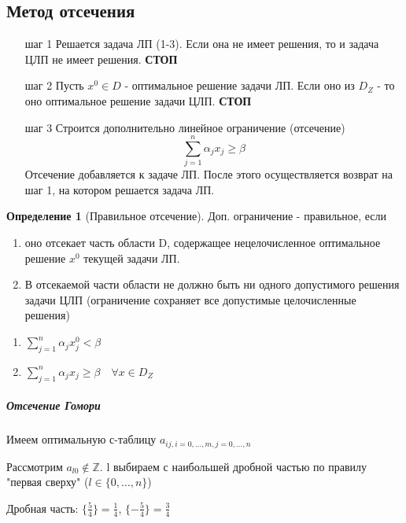 \documentclass[a4paper]{article}
\theoremstyle{definition}
\newtheorem*{definition}{Определение}
\theoremstyle{remark}
\begin{document}
\subsection{Метод отсечения}
\begin{enumerate}
    \item [шаг 1] Решается задача ЛП (1-3). Если она не имеет решения, то и задача ЦЛП не имеет решения. \textbf{СТОП}
    \item [шаг 2] Пусть $x^0\in D$ - оптимальное решение задачи ЛП. Если оно из $D_Z$ - то оно оптимальное решение задачи ЦЛП. \textbf{СТОП}
    \item [шаг 3] Строится дополнительно линейное ограничение (отсечение)
    \[\sum_{j = 1}^n \alpha_j x_j \ge \beta\]
    Отсечение добавляется к задаче ЛП.
    После этого осуществляется возврат на шаг 1, на котором решается задача ЛП.
\end{enumerate}
\begin{definition}[Правильное отсечение]
    Доп. ограничение - правильное, если
    \begin{enumerate}
        \item оно отсекает часть области D, содержащее нецелочисленное оптимальное решение $x^0$ текущей задачи ЛП.
        \item В отсекаемой части области не должно быть ни одного допустимого решения задачи ЦЛП (ограничение сохраняет все допустимые целочисленные решения)
    \end{enumerate}
\end{definition}
\begin{enumerate}
    \item $\sum_{j = 1}^n \alpha_j x_j^0 < \beta$
    \item  $\sum_{j = 1}^n \alpha_j x_j \ge \beta \quad \forall x \in D_Z$
\end{enumerate}
\subparagraph*{Отсечение Гомори}
Имеем оптимальную с-таблицу $a_{ij, i = 0, \dots, m, j = 0, \dots, n}$

Рассмотрим $a_{l0}\notin \mathbb{Z}$. l выбираем с наибольшей дробной частью по правилу "первая сверху" ($l\in \{0, \dots, n\}$)

Дробная часть: $\{\frac54\} = \frac14$, $\{-\frac54\} = \frac34$
\end{document}
